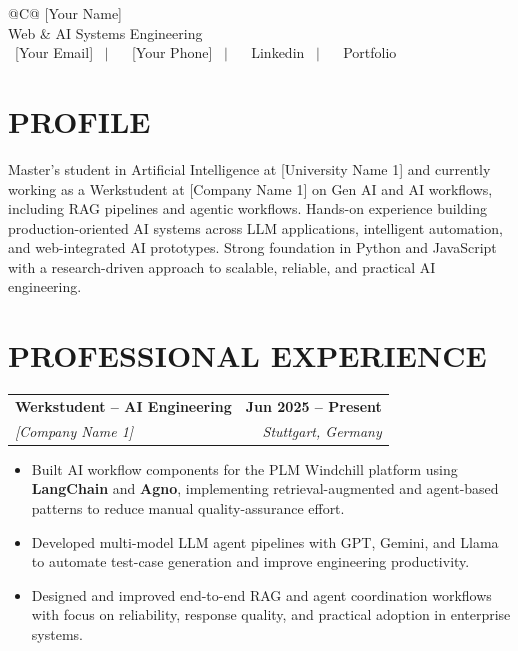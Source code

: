 \documentclass[a4paper,11pt]{article}
\makeatletter
\newcommand{\entryheader}[4]{%
  \begin{tabularx}{\textwidth}{@{}>{\RaggedRight\arraybackslash}X r@{}}
    \textbf{#1} & \textbf{#2} \\
    \textit{#3} & \textit{#4} \\
  \end{tabularx}%
}
\newenvironment{entrybullets}{%
  \begin{minipage}[t]{0.77\textwidth}
    \begin{itemize}[leftmargin=*,label=\textbullet,align=left]
}{%
    \end{itemize}
  \end{minipage}
}
\newcommand{\safehref}[2]{#2}
\let\href\safehref
\makeatother
\begin{document}
\pagestyle{empty}

\begin{tabularx}{\linewidth}{@{}C@{}}
  \Huge{[Your Name]}\\[10pt]
  
  \large{ Web \& AI Systems Engineering}\\[3pt]


  \href{mailto: [Your Email]}{\raisebox{-0.05\height}{\faEnvelope} \ [Your Email]} \ $|$ \
  \href{tel:[Your Phone]}{ \ [Your Phone]} \ $|$ \
  \href{[Your LinkedIn URL]}{\raisebox{-0.05\height}{\faLinkedin} \ Linkedin} \ $|$ \
  \href{[Your Portfolio URL]}{\raisebox{-0.05\height}{\faLink} \ Portfolio}\\
\end{tabularx}

\section*{PROFILE}
Master's student in Artificial Intelligence at [University Name 1] and currently working as a Werkstudent at [Company Name 1] on Gen AI and AI workflows, including RAG pipelines and agentic workflows. Hands-on experience building production-oriented AI systems across LLM applications, intelligent automation, and web-integrated AI prototypes. Strong foundation in Python and JavaScript with a research-driven approach to scalable, reliable, and practical AI engineering.


\section*{PROFESSIONAL EXPERIENCE}
\entryheader{Werkstudent -- AI Engineering}{Jun 2025 -- Present}{[Company Name 1]}{Stuttgart, Germany}
\begin{entrybullets}
  \item Built AI workflow components for the PLM Windchill platform using \textbf{LangChain} and \textbf{Agno}, implementing retrieval-augmented and agent-based patterns to reduce manual quality-assurance effort.
  \item Developed multi-model LLM agent pipelines with GPT, Gemini, and Llama to automate test-case generation and improve engineering productivity.
  \item Designed and improved end-to-end RAG and agent coordination workflows with focus on reliability, response quality, and practical adoption in enterprise systems.
\end{entrybullets}
\end{document}
